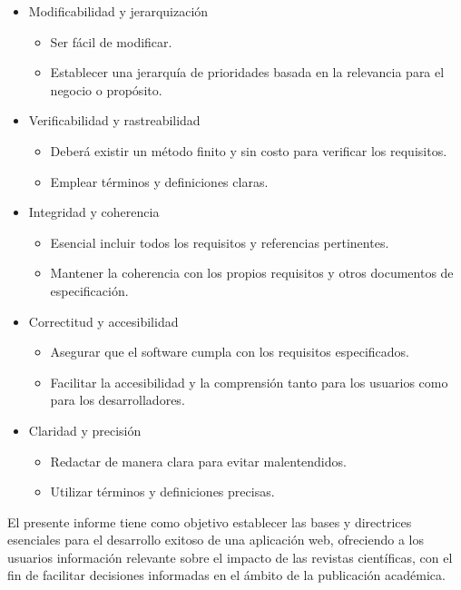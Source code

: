 \begin{itemize}
\tightlist
\item
	Modificabilidad y jerarquización
	\begin{itemize}
	\item 
	Ser fácil de modificar.
	\item
	Establecer una jerarquía de prioridades basada en la relevancia para el negocio o propósito.
	\end{itemize}
\item
	Verificabilidad y rastreabilidad
	\begin{itemize}
	\item 
	Deberá existir un método finito y sin costo para verificar los requisitos.
	\item
	Emplear términos y definiciones claras.
	\end{itemize}
\item
	Integridad y coherencia
	\begin{itemize}
	\item 
	Esencial incluir todos los requisitos y referencias pertinentes.
	\item
	Mantener la coherencia con los propios requisitos y otros documentos de especificación.
	\end{itemize}
 \item
	Correctitud y accesibilidad
	\begin{itemize}
	\item 
	Asegurar que el software cumpla con los requisitos especificados.
	\item
	Facilitar la accesibilidad y la comprensión tanto para los usuarios como para los desarrolladores.
	\end{itemize}

 \item
	Claridad y precisión
	\begin{itemize}
	\item 
	Redactar de manera clara para evitar malentendidos.
	\item
	Utilizar términos y definiciones precisas.
	\end{itemize}

\end{itemize}

El presente informe tiene como objetivo establecer las bases y directrices esenciales para el desarrollo exitoso de una aplicación web, ofreciendo a los usuarios información relevante sobre el impacto de las revistas científicas, con el fin de facilitar decisiones informadas en el ámbito de la publicación académica.


